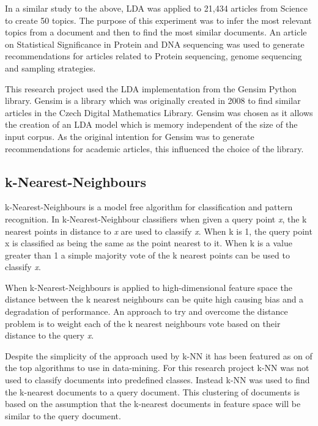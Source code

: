 In a similar study to the above, LDA was applied to 21,434 articles from Science to create 50 topics.
The purpose of this experiment was to infer the most relevant topics from a document and then to find the most similar documents.
An article on Statistical Significance in Protein and DNA sequencing was used to generate recommendations for articles related to Protein sequencing, genome sequencing and sampling strategies.

This research project used the LDA implementation from the Gensim Python library.
Gensim is a library which was originally created in 2008 to find similar articles in the Czech Digital Mathematics Library.
Gensim was chosen as it allows the creation of an LDA model which is memory independent of the size of the input corpus.
As the original intention for Gensim was to generate recommendations for academic articles, this influenced the choice of the library.\cite{rehurek_lrec}


\subsection{k-Nearest-Neighbours}
k-Nearest-Neighbours is a model free algorithm for classification and pattern recognition.
In k-Nearest-Neighbour classifiers when given a query point \textit{x}, the k nearest points in distance to \textit{x} are used to classify \textit{x}.
When k is 1, the query point x is classified as being the same as the point nearest to it.
When k is a value greater than 1 a simple majority vote of the k nearest points can be used to classify \textit{x}.\cite{elementsStat}

When k-Nearest-Neighbours is applied to high-dimensional feature space the distance between the k nearest neighbours can be quite high causing bias and a degradation of performance.\cite{elementsStat}
An approach to try and overcome the distance problem is to weight each of the k nearest neighbours vote based on their distance to the query \textit{x}.\cite{top10datamining}

Despite the simplicity of the approach used by k-NN it has been featured as on of the top algorithms to use in data-mining.\cite{top10datamining}
For this research project k-NN was not used to classify documents into predefined classes.
Instead k-NN was used to find the k-nearest documents to a query document.
This clustering of documents is based on the assumption that the k-nearest documents in feature space will be similar to the query document.

